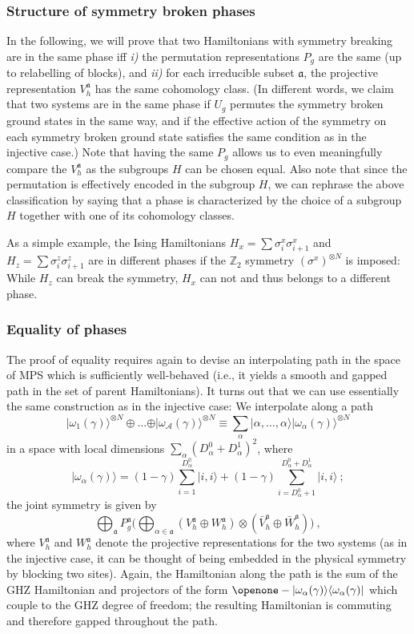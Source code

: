 \documentclass[twocolumn,superscriptaddress,prb,linenumbers]{revtex4-1}
\newcommand{\ket}[1]{\vert#1\rangle}
\newcommand{\bra}[1]{\langle#1\vert}
\newcommand{\mc}[1]{\mathcal{#1}}
\newcommand{\mf}[1]{\mathfrak{#1}}
\newcommand{\sss}[1]{\subsubsection{#1}}
\begin{document}
\sss{Structure of symmetry broken phases}%
In the following, we will prove that two Hamiltonians with symmetry
breaking are in the same phase iff \emph{i)} the permutation
representations $P_g$ are the same (up to relabelling of blocks), and
\emph{ii)} for each irreducible subset $\mf a$, the projective
representation $V_h^{\mf a}$ has the same cohomology class.
(In different words, we claim that two
systems are in the same phase if $U_g$ permutes the symmetry broken ground
states in the same way, and if the effective action of the symmetry on each
symmetry broken ground state satisfies the same condition as in the
injective case.) Note that having the same $P_g$ allows us to even
meaningfully compare the $V_h^{\mf a}$ as the subgroups $H$ can be chosen
equal. Also note that since the permutation is effectively encoded in the
subgroup $H$, we can rephrase the above classification by saying that a
phase is characterized by the choice of a subgroup $H$ together with one of its
cohomology classes.


As a simple example, the Ising
Hamiltonians $H_x=\sum \sigma^x_i\sigma^x_{i+1}$ and
$H_z=\sum \sigma^z_i\sigma^z_{i+1}$ are in different phases if the $\mathbb
    Z_2$ symmetry $(\sigma^x)^{\otimes N}$ is imposed: While $H_z$ can break
the symmetry, $H_x$ can not and thus belongs to a different phase.



\sss{Equality of phases}%
The proof of equality requires again to devise an interpolating path in
the space of MPS which is sufficiently well-behaved (i.e., it yields a
smooth and gapped path in the set of parent Hamiltonians). It turns out
that we can use essentially the same construction as in the injective case:
We interpolate along a path
\[
    \ket{\omega_1(\gamma)}^{\otimes N}\oplus\dots
    \oplus\ket{\omega_{\mc A}(\gamma)}^{\otimes N}
    \equiv \sum_\alpha \ket{\alpha,\dots,\alpha}
    \ket{\omega_\alpha(\gamma)}^{\otimes N}
\]
in a space with local dimensions $\sum_\alpha(D_\alpha^0+D_\alpha^1)^2$,
where
\[
    \ket{\omega_\alpha(\gamma)} =
    (1-\gamma)\sum_{i=1}^{D_\alpha^0}\ket{i,i}+
    (1-\gamma)\sum_{i=D_\alpha^0+1}^{D_\alpha^0+D_\alpha^1}\ket{i,i}\ ;
\]
the joint symmetry is given by
\[
    \bigoplus_{\mathfrak a}
    P_g^{\mathfrak a}
    \Big(\bigoplus_{\alpha\in \mathfrak a}
        (V_h^{\mathfrak a}\oplus W_h^{\mathfrak a})\otimes
        (\bar V_h^{\mathfrak a}\oplus \bar W_h^{\mathfrak a})\Big)\ ,
\]
where $V_h^{\mf a}$ and $W_h^{\mf a}$ denote the projective
representations for the two systems (as in the injective case, it can be
thought of being embedded in the physical symmetry by blocking two sites).
Again, the Hamiltonian along the path is the sum of the GHZ Hamiltonian
and projectors of the form
$\openone-\ket{\omega_\alpha(\gamma)}\bra{\omega_\alpha(\gamma)}$ which
couple to the GHZ degree of freedom; the resulting Hamiltonian is
commuting and therefore gapped throughout the path.
\end{document}

